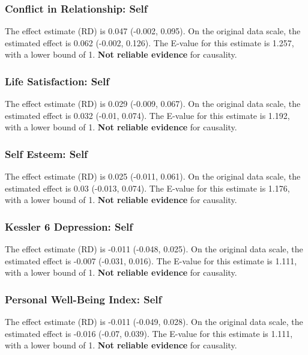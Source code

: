 \documentclass[
  singlecolumn]{article}
\begin{document}
\subsubsection{Conflict in Relationship:
Self}\label{conflict-in-relationship-self-6}

The effect estimate (RD) is 0.047 (-0.002, 0.095). On the original data
scale, the estimated effect is 0.062 (-0.002, 0.126). The E-value for
this estimate is 1.257, with a lower bound of 1. \textbf{Not reliable
evidence} for causality.

\subsubsection{Life Satisfaction: Self}\label{life-satisfaction-self-6}

The effect estimate (RD) is 0.029 (-0.009, 0.067). On the original data
scale, the estimated effect is 0.032 (-0.01, 0.074). The E-value for
this estimate is 1.192, with a lower bound of 1. \textbf{Not reliable
evidence} for causality.

\subsubsection{Self Esteem: Self}\label{self-esteem-self-6}

The effect estimate (RD) is 0.025 (-0.011, 0.061). On the original data
scale, the estimated effect is 0.03 (-0.013, 0.074). The E-value for
this estimate is 1.176, with a lower bound of 1. \textbf{Not reliable
evidence} for causality.

\subsubsection{Kessler 6 Depression:
Self}\label{kessler-6-depression-self-6}

The effect estimate (RD) is -0.011 (-0.048, 0.025). On the original data
scale, the estimated effect is -0.007 (-0.031, 0.016). The E-value for
this estimate is 1.111, with a lower bound of 1. \textbf{Not reliable
evidence} for causality.

\subsubsection{Personal Well-Being Index:
Self}\label{personal-well-being-index-self-6}

The effect estimate (RD) is -0.011 (-0.049, 0.028). On the original data
scale, the estimated effect is -0.016 (-0.07, 0.039). The E-value for
this estimate is 1.111, with a lower bound of 1. \textbf{Not reliable
evidence} for causality.
\end{document}
